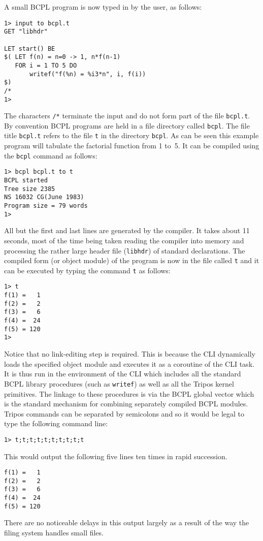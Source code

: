 A small BCPL program is now typed in by the user, as follows:
\begin{verbatim}
1> input to bcpl.t
GET "libhdr"

LET start() BE
$( LET f(n) = n=0 -> 1, n*f(n-1)
   FOR i = 1 TO 5 DO
       writef("f(%n) = %i3*n", i, f(i))
$)
/*
1>
\end{verbatim}
\noindent
The characters \verb|/*| terminate the input and do not form part of
the file \verb|bcpl.t|.  By convention BCPL programs are held in a
file directory called \verb|bcpl|.  The file title \verb|bcpl.t|
refers to the file \verb|t| in the directory \verb|bcpl|.  As can be
seen this example program will tabulate the factorial function from 1
to~5.  It can be compiled using the \verb|bcpl| command as follows:
\begin{verbatim}
1> bcpl bcpl.t to t
BCPL started
Tree size 2385
NS 16032 CG(June 1983)
Program size = 79 words
1>
\end{verbatim}
All but the first and last lines are generated by the compiler.  It
takes about 11 seconds, most of the time being taken reading the
compiler into memory and processing the rather large header file
(\verb|libhdr|) of standard declarations.  The compiled form (or
object module) of the program is now in the file called \verb|t| and
it can be executed by typing the command \verb|t| as follows:
\begin{verbatim}
1> t
f(1) =   1
f(2) =   2
f(3) =   6
f(4) =  24
f(5) = 120
1> 
\end{verbatim}
Notice that no link-editing step is required.  This is because the CLI
dynamically loads the specified object module and executes it as a
coroutine of the CLI task.  It is thus run in the environment of the
CLI which includes all the standard BCPL library procedures (such as
\verb|writef|) as well as all the Tripos kernel primitives.  The linkage to
these procedures is via the BCPL global vector which is the standard
mechanism for combining separately compiled BCPL modules.  Tripos
commands can be separated by semicolons and so it would be legal to
type the following command line:
\begin{verbatim}
1> t;t;t;t;t;t;t;t;t;t
\end{verbatim}
\noindent
This would output the following five lines ten times in rapid succession.
\begin{verbatim}
f(1) =   1
f(2) =   2
f(3) =   6
f(4) =  24
f(5) = 120
\end{verbatim}
There are no noticeable delays in this output largely as a result of
the way the filing system handles small files.

